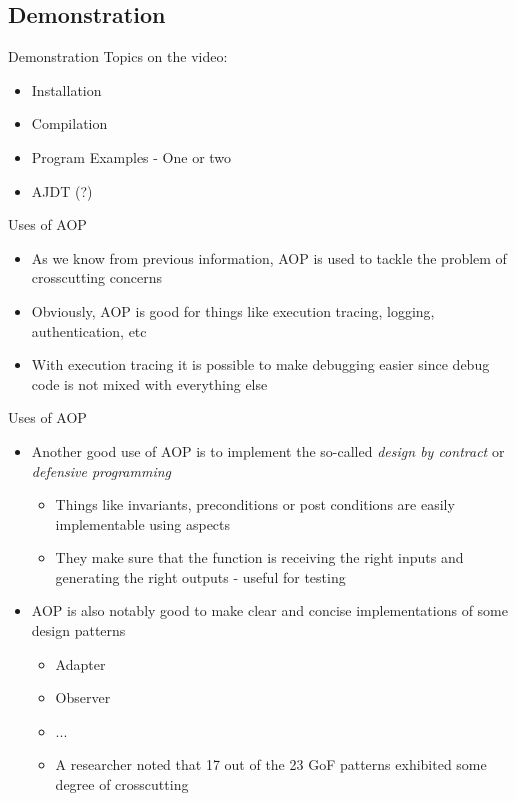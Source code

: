 \documentclass[11pt]{beamer}
\begin{document}
\subsection*{Demonstration}

\begin{frame}{Demonstration}
Topics on the video:
\begin{itemize}
\item Installation
\item Compilation
\item Program Examples - One or two
\item AJDT (?)
\end{itemize}
\end{frame}

\begin{frame}{Uses of AOP}
\begin{itemize}
   \item As we know from previous information, AOP is used to tackle the problem of crosscutting concerns
   \item Obviously, AOP is good for things like execution tracing, logging, authentication, etc
   \item With execution tracing it is possible to make debugging easier since debug code is not mixed with everything else
\end{itemize}
\end{frame}

\begin{frame}{Uses of AOP}
\begin{itemize}
   \item Another good use of AOP is to implement the so-called \emph{design by contract} or \emph{defensive programming}
   \begin{itemize}
      \item Things like invariants, preconditions or post conditions are easily implementable using aspects
      \item They make sure that the function is receiving the right inputs and generating the right outputs - useful for testing
   \end{itemize}
   \item AOP is also notably good to make clear and concise implementations of some design patterns
      \begin{itemize}
         \item Adapter
         \item Observer
         \item ...
         \item A researcher noted that 17 out of the 23 GoF patterns exhibited some degree of crosscutting %
      \end{itemize}
\end{itemize}
\end{frame}
\end{document}
